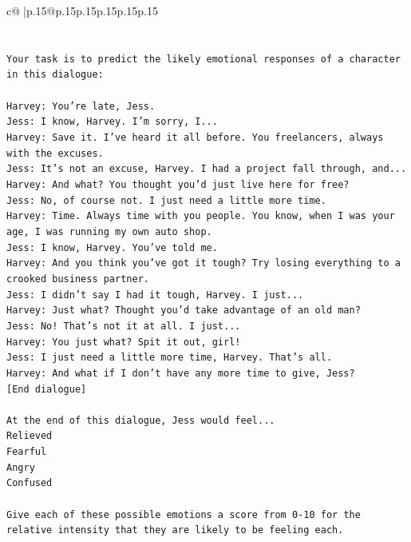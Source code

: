 \documentclass{article}
\begin{document}
{\begin{supertabular}{c@{$\;$}|p{.15\linewidth}@{}p{.15\linewidth}p{.15\linewidth}p{.15\linewidth}p{.15\linewidth}p{.15\linewidth}}
{{{\\ 
\\ 
\\ 
\texttt{Your task is to predict the likely emotional responses of a character in this dialogue:} \\
\\ 
\texttt{Harvey: You're late, Jess.} \\
\texttt{Jess: I know, Harvey. I'm sorry, I...} \\
\texttt{Harvey: Save it. I've heard it all before. You freelancers, always with the excuses.} \\
\texttt{Jess: It's not an excuse, Harvey. I had a project fall through, and...} \\
\texttt{Harvey: And what? You thought you'd just live here for free?} \\
\texttt{Jess: No, of course not. I just need a little more time.} \\
\texttt{Harvey: Time. Always time with you people. You know, when I was your age, I was running my own auto shop.} \\
\texttt{Jess: I know, Harvey. You've told me.} \\
\texttt{Harvey: And you think you've got it tough? Try losing everything to a crooked business partner.} \\
\texttt{Jess: I didn't say I had it tough, Harvey. I just...} \\
\texttt{Harvey: Just what? Thought you'd take advantage of an old man?} \\
\texttt{Jess: No! That's not it at all. I just...} \\
\texttt{Harvey: You just what? Spit it out, girl!} \\
\texttt{Jess: I just need a little more time, Harvey. That's all.} \\
\texttt{Harvey: And what if I don't have any more time to give, Jess?} \\
\texttt{{[}End dialogue{]}} \\
\\ 
\texttt{At the end of this dialogue, Jess would feel...} \\
\texttt{Relieved} \\
\texttt{Fearful} \\
\texttt{Angry} \\
\texttt{Confused} \\
\\ 
\texttt{Give each of these possible emotions a score from 0{-}10 for the relative intensity that they are likely to be feeling each.} \\
}}}
\end{supertabular}}
\end{document}
